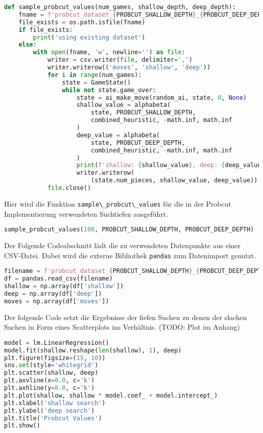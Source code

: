 \begin{lstlisting}[language=Python]
def sample_probcut_values(num_games, shallow_depth, deep_depth):
    fname = f'probcut_dataset_{PROBCUT_SHALLOW_DEPTH}_{PROBCUT_DEEP_DEPTH}.csv'
    file_exists = os.path.isfile(fname)
    if file_exists:
        print('using existing dataset')
    else:
        with open(fname, 'w', newline='') as file:
            writer = csv.writer(file, delimiter=',')
            writer.writerow(('moves', 'shallow', 'deep'))
            for i in range(num_games):
                state = GameState()
                while not state.game_over:
                    state = ai_make_move(random_ai, state, 0, None)
                    shallow_value = alphabeta(
                        state, PROBCUT_SHALLOW_DEPTH,
                        combined_heuristic, -math.inf, math.inf
                    )
                    deep_value = alphabeta(
                        state, PROBCUT_DEEP_DEPTH,
                        combined_heuristic, -math.inf, math.inf
                    )
                    print(f'shallow: {shallow_value}, deep: {deep_value}')
                    writer.writerow(
                        (state.num_pieces, shallow_value, deep_value))
            file.close()
\end{lstlisting}

Hier wird die Funktion \passthrough{\lstinline!sample\_probcut\_values!}
für die in der Probcut Implementierung verwendeten Suchtiefen
ausgeführt.

\begin{lstlisting}[language=Python]
sample_probcut_values(100, PROBCUT_SHALLOW_DEPTH, PROBCUT_DEEP_DEPTH)
\end{lstlisting}

Der Folgende Codeabschnitt lädt die zu verwendeten Datenpunkte aus einer
CSV-Datei. Dabei wird die externe Bibliothek
\passthrough{\lstinline!pandas!} zum Datenimport genutzt.

\begin{lstlisting}[language=Python]
filename = f'probcut_dataset_{PROBCUT_SHALLOW_DEPTH}_{PROBCUT_DEEP_DEPTH}.csv'
df = pandas.read_csv(filename)
shallow = np.array(df['shallow'])
deep = np.array(df['deep'])
moves = np.array(df['moves'])
\end{lstlisting}

Der folgende Code setzt die Ergebnisse der fiefen Suchen zu denen der
slachen Suchen in Form eines Scatterplots ins Verhältnis. (TODO: Plot im
Anhang)

\begin{lstlisting}[language=Python]
model = lm.LinearRegression()
model.fit(shallow.reshape(len(shallow), 1), deep)
plt.figure(figsize=(15, 10))
sns.set(style='whitegrid')
plt.scatter(shallow, deep)
plt.axvline(x=0.0, c='k')
plt.axhline(y=0.0, c='k')
plt.plot(shallow, shallow * model.coef_ + model.intercept_)
plt.xlabel('shallow search')
plt.ylabel('deep search')
plt.title('Probcut Values')
plt.show()
\end{lstlisting}

